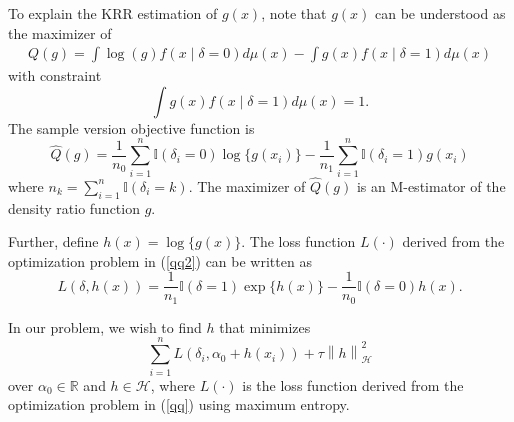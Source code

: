 \documentclass[12pt]{article}
\newcommand{\bx}{{x}}
\begin{document}
To explain the KRR estimation of $g(x)$, note that $g(x)$ can be understood as the  maximizer of 
 \begin{align} 
     Q (g) = \int \log \left( g \right) f( \bx \mid \delta =0)  d \mu(\bx)   -   \int g (x) f( \bx \mid \delta = 1)   d \mu(x)    \label{qq} 
    \end{align} 
    with constraint 
    $$  \int g (x) f( \bx \mid \delta = 1)   d \mu(x) = 1 . 
    $$ 
    The sample version objective function is 
 \begin{equation} 
\hat{Q}( g) =  \frac{1}{n_0} \sum_{i=1}^n \mathbb{I} ( \delta_i=0) \log \{ g(\bx_i)  \} - \frac{1}{n_1} \sum_{i=1}^n \mathbb{I} ( \delta_i=1) g (\bx_i) 
\label{qq2} 
\end{equation}  
where $n_k = \sum_{i=1}^n \mathbb{I} (\delta_i = k ) $. The maximizer of $\hat{Q} (g)$ is an M-estimator of the density ratio function $g$. 






Further, define 
$h (\bx)= \log \{ g(\bx)\}$.
 The loss function 
 $L ( \cdot)$  derived from the optimization problem in (\ref{qq2}) can be written as 
\begin{equation*} 
 L( \delta, h(\bx)  ) = \frac{1}{n_1} \mathbb{I} (\delta=1) \exp \{ h(\bx) \} - \frac{1}{n_0}  \mathbb{I} (\delta=0) h(\bx).
\end{equation*} 



In our  problem, we wish to find $h$ that minimizes 
\begin{equation}
\sum_{i=1}^n L( \delta_i, \alpha_{0} + h(x_i) ) + \tau \left\| h \right\|_{\mathcal{H} }^{2} \label{18} 
\end{equation} 
over $\alpha_0 \in \mathbb{R}$ and $h \in \mathcal{H} $, where $L ( \cdot) $ is the loss function  derived from the optimization problem in (\ref{qq}) using maximum entropy. 
\end{document}
